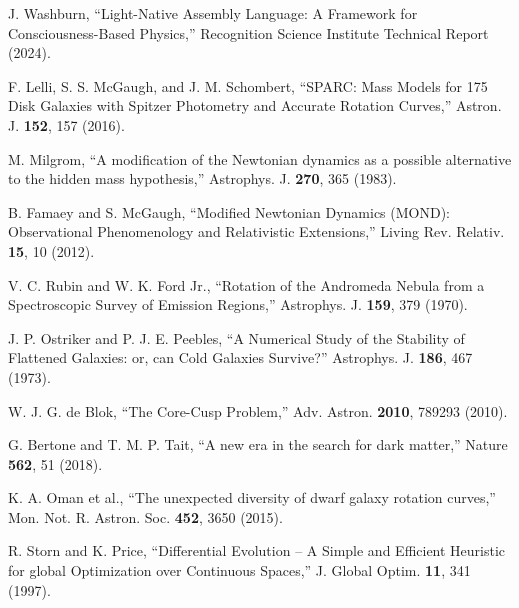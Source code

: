 \documentclass[twocolumn,prd,amsmath,amssymb,aps,superscriptaddress,nofootinbib]{revtex4-2}
\begin{document}
\begin{thebibliography}{99}

 J. Washburn, ``Light-Native Assembly Language: A Framework for Consciousness-Based Physics,'' Recognition Science Institute Technical Report (2024).

 F. Lelli, S. S. McGaugh, and J. M. Schombert, ``SPARC: Mass Models for 175 Disk Galaxies with Spitzer Photometry and Accurate Rotation Curves,'' Astron. J. \textbf{152}, 157 (2016).

 M. Milgrom, ``A modification of the Newtonian dynamics as a possible alternative to the hidden mass hypothesis,'' Astrophys. J. \textbf{270}, 365 (1983).

 B. Famaey and S. McGaugh, ``Modified Newtonian Dynamics (MOND): Observational Phenomenology and Relativistic Extensions,'' Living Rev. Relativ. \textbf{15}, 10 (2012).

 V. C. Rubin and W. K. Ford Jr., ``Rotation of the Andromeda Nebula from a Spectroscopic Survey of Emission Regions,'' Astrophys. J. \textbf{159}, 379 (1970).

 J. P. Ostriker and P. J. E. Peebles, ``A Numerical Study of the Stability of Flattened Galaxies: or, can Cold Galaxies Survive?'' Astrophys. J. \textbf{186}, 467 (1973).

 W. J. G. de Blok, ``The Core-Cusp Problem,'' Adv. Astron. \textbf{2010}, 789293 (2010).

 G. Bertone and T. M. P. Tait, ``A new era in the search for dark matter,'' Nature \textbf{562}, 51 (2018).

 K. A. Oman et al., ``The unexpected diversity of dwarf galaxy rotation curves,'' Mon. Not. R. Astron. Soc. \textbf{452}, 3650 (2015).

 R. Storn and K. Price, ``Differential Evolution -- A Simple and Efficient Heuristic for global Optimization over Continuous Spaces,'' J. Global Optim. \textbf{11}, 341 (1997).

\end{thebibliography}
\end{document}
